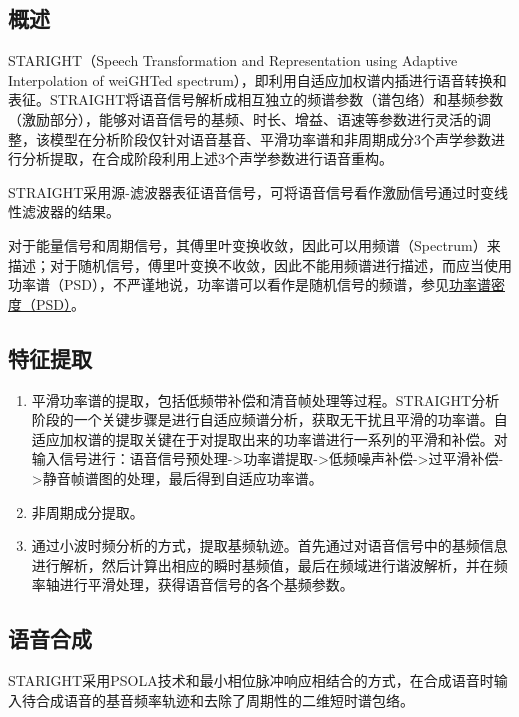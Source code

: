 \documentclass[cn,10pt,math=newtx,citestyle=gb7714-2015,bibstyle=gb7714-2015]{elegantbook}
\begin{document}
\subsection{概述}

STARIGHT（Speech Transformation and Representation using Adaptive Interpolation of weiGHTed spectrum），即利用自适应加权谱内插进行语音转换和表征。STRAIGHT将语音信号解析成相互独立的频谱参数（谱包络）和基频参数（激励部分），能够对语音信号的基频、时长、增益、语速等参数进行灵活的调整，该模型在分析阶段仅针对语音基音、平滑功率谱和非周期成分3个声学参数进行分析提取，在合成阶段利用上述3个声学参数进行语音重构。

STRAIGHT采用源-滤波器表征语音信号，可将语音信号看作激励信号通过时变线性滤波器的结果。

\begin{note}
  对于能量信号和周期信号，其傅里叶变换收敛，因此可以用频谱（Spectrum）来描述；对于随机信号，傅里叶变换不收敛，因此不能用频谱进行描述，而应当使用功率谱（PSD），不严谨地说，功率谱可以看作是随机信号的频谱，参见\href{https://zhuanlan.zhihu.com/p/417454806}{功率谱密度（PSD）}。
\end{note}

\subsection{特征提取}

\begin{enumerate}
  \item 平滑功率谱的提取，包括低频带补偿和清音帧处理等过程。STRAIGHT分析阶段的一个关键步骤是进行自适应频谱分析，获取无干扰且平滑的功率谱。自适应加权谱的提取关键在于对提取出来的功率谱进行一系列的平滑和补偿。对输入信号进行：语音信号预处理->功率谱提取->低频噪声补偿->过平滑补偿->静音帧谱图的处理，最后得到自适应功率谱。
  \item 非周期成分提取。
  \item 通过小波时频分析的方式，提取基频轨迹。首先通过对语音信号中的基频信息进行解析，然后计算出相应的瞬时基频值，最后在频域进行谐波解析，并在频率轴进行平滑处理，获得语音信号的各个基频参数。
\end{enumerate}

\subsection{语音合成}

STARIGHT采用PSOLA技术和最小相位脉冲响应相结合的方式，在合成语音时输入待合成语音的基音频率轨迹和去除了周期性的二维短时谱包络。
\end{document}
